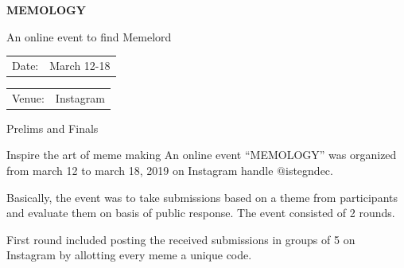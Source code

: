\documentclass[12pt, a4 paper]{article}
\begin{document}
\begin{center}
\Huge \bfseries \ttfamily MEMOLOGY
\end{center}

\begin{center}
\large An online event to find Memelord
\end{center}

\begin{center}
\begin{multicols}{2}
\begin{tabular}{l r}
Date: & March 12-18\\ %
\end{tabular}
\columnbreak
\begin{tabular}{l r}
Venue: & Instagram \\ %
\end{tabular}
\end{multicols}


\begin{LARGE}
Prelims  and  Finals
\end{LARGE}

\begin{Large}
\begin{multicols}{2}
Inspire the art of meme making
An online event “MEMOLOGY” was organized from march 12 to march 18, 2019 on Instagram handle $@$istegndec. 
\columnbreak
\end{multicols}

\begin{multicols}{2}


\columnbreak
Basically, the event was to take submissions based on a theme from participants and evaluate them on basis of public response. The event consisted of 2 rounds.
\end{multicols}

\newpage 


\begin{multicols}{2}
First round included posting the received submissions in groups of 5 on Instagram by allotting every meme a unique code. 
\columnbreak
  

\end{multicols}
\end{Large}
\end{center}
\end{document}
